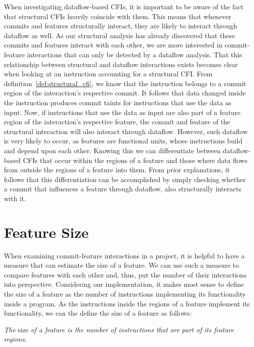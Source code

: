 When investigating dataflow-based CFIs, it is important to be aware of the fact that structural CFIs heavily coincide with them.
This means that whenever commits and features structurally interact, they are likely to interact through dataflow as well.
As our structural analysis has already discovered that these commits and features interact with each other, 
we are more interested in commit-feature interactions that can only be detected by a dataflow analysis.
That this relationship between structural and dataflow interactions exists becomes clear when looking at an instruction accounting for a structural CFI.
From definition~\ref{def:structural_cfi}, we know that the instruction belongs to a commit region of the interaction's respective commit.
It follows that data changed inside the instruction produces commit taints for instructions that use the data as input. 
Now, if instructions that use the data as input are also part of a feature region of the interaction's respective feature, the commit and feature of the structural interaction will also interact through dataflow.
However, such dataflow is very likely to occur, as features are functional units, whose instructions build and depend upon each other. 
Knowing this we can differentiate between dataflow-based CFIs that occur within the regions of a feature and those where data flows from outside the regions of a feature into them.
From prior explanations, it follows that this differentiation can be accomplished by simply checking whether a commit that influences a feature through dataflow, also structurally interacts with it. 

\section{Feature Size}\label{sec:feature_size}

When examining commit-feature interactions in a project, it is helpful to have a measure that can estimate the size of a feature.
We can use such a measure to compare features with each other and, thus, put the number of their interactions into perspective.
Considering our implementation, it makes most sense to define the size of a feature as the number of instructions implementing its functionality inside a program.
As the instructions inside the regions of a feature implement its functionality, we can the define the size of a feature as follows:
\begin{definition} \label{def:feature_size}
\emph{The} size \emph{of a feature is the number of instructions that are part of its feature regions.}
\end{definition}

